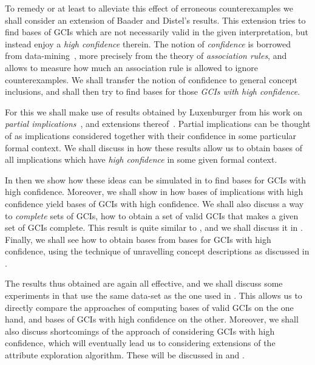 To remedy or at least to alleviate this effect of erroneous counterexamples we shall
consider an extension of Baader and Distel's results.  This extension tries to find bases
of GCIs which are not necessarily valid in the given interpretation, but instead enjoy a
\emph{high confidence} therein.  The notion of \emph{confidence} is borrowed from
data-mining~\cite{arules:agrawal:association-rules}, more precisely from the theory of
\emph{association rules}, and allows to measure how much an association rule is allowed to
ignore counterexamples.  We shall transfer the notion of confidence to general concept
inclusions, and shall then try to find bases for those \emph{GCIs with high confidence}.

For this we shall make use of results obtained by Luxenburger from his work on
\emph{partial implications}~\cite{diss:Luxenburger,Luxenburger91}, and extensions
thereof~\cite{DBLP:conf/ki/StummeTBPL01}.  Partial implications can be thought of as
implications considered together with their confidence in some particular formal context.
We shall discuss in  how these results allow us to obtain bases of all
implications which have \emph{high confidence} in some given formal context.

In  then we show how these ideas can be simulated in \ELgfpbot to
find bases for GCIs with high confidence.  Moreover, we shall show in
 how bases of implications with high confidence yield bases
of GCIs with high confidence.  We shall also discuss a way to \emph{complete} sets of
GCIs, \ie how to obtain a set of valid GCIs that makes a given set of GCIs complete.  This
result is quite similar to , and we shall discuss it in
.  Finally, we shall see how to obtain \ELbot bases from
\ELgfpbot bases for GCIs with high confidence, using the technique of unravelling
\ELgfpbot concept descriptions as discussed in .

The results thus obtained are again all effective, and we shall discuss some experiments
in  that use the same data-set as the one used in
.  This allows us to directly compare the approaches of
computing bases of valid GCIs on the one hand, and bases of GCIs with high confidence on
the other.  Moreover, we shall also discuss shortcomings of the approach of considering
GCIs with high confidence, which will eventually lead us to considering extensions of the
attribute exploration algorithm.  These will be discussed in  and
.

